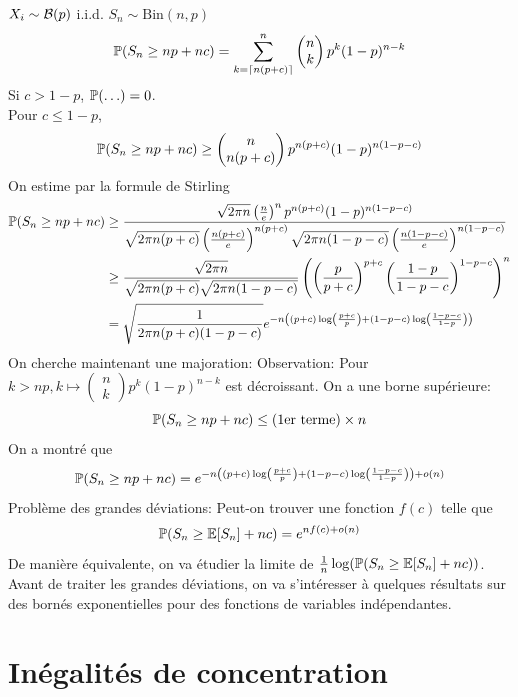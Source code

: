 \documentclass[]{report}
\begin{document}
    $X_i\sim \mathcal{B}(p)$ i.i.d. $S_n\sim \text{Bin}(n,p)$
    \[\mathbb{P}(S_n\ge np+nc)=\sum_{k=\lceil n(p+c)\rceil}^{n}\left(\begin{matrix}
        n\\
        k
    \end{matrix}\right)p^k(1-p)^{n-k}\]
    Si $c>1-p$, $\mathbb{P}(\ldots)=0$.\\
    Pour $c\le 1-p$,
    \[\mathbb{P}(S_n\ge np+nc)\ge \left(\begin{matrix}
        n\\
        n(p+c)
    \end{matrix}\right) p^{n(p+c)}(1-p)^{n(1-p-c)}\]
    On estime par la formule de Stirling
    \begin{align*}
        \mathbb{P}(S_n\ge np+nc)&\ge\frac{\sqrt{2\pi n}\left(\frac{n}{e}\right)^n p^{n(p+c)}(1-p)^{n(1-p-c)}}{\sqrt{2\pi n(p+c)}\left(\frac{n(p+c)}{e}\right)^{n(p+c)}\sqrt{2\pi n(1-p-c)}\left(\frac{n(1-p-c)}{e}\right)^{n(1-p-c)}}\\
        &\ge \frac{\sqrt{2\pi n}}{\sqrt{2\pi n(p+c)}\sqrt{2\pi n(1-p-c)}}\left(\left(\frac{p}{p+c}\right)^{p+c}\left(\frac{1-p}{1-p-c}\right)^{1-p-c}\right)^n\\
        &=\sqrt{\frac{1}{2\pi n(p+c)(1-p-c)}} e^{-n\left((p+c)\log \left(\frac{p+c}{p}\right)+(1-p-c)\log\left(\frac{1-p-c}{1-p}\right)\right)}
    \end{align*}
    On cherche maintenant une majoration: Observation: Pour $k>np,k\mapsto\left(\begin{matrix}
        n\\k
    \end{matrix}\right)p^k (1-p)^{n-k}$ est décroissant. On a une borne supérieure:
    \[\mathbb{P}(S_n\ge np+nc)\le (\text{1er terme})\times n\]
    On a montré que
    \[\mathbb{P}(S_n\ge np+nc)=e^{-n\left((p+c)\log\left(\frac{p+c}{p}\right)+(1-p-c)\log\left( \frac{1-p-c}{1-p}\right)\right)+o(n)}\]
    Problème des grandes déviations: Peut-on trouver une fonction $f(c)$ telle que
    \[\mathbb{P}(S_n\ge \mathbb{E}[S_n]+nc)=e^{nf(c)+o(n)}\]
    De manière équivalente, on va étudier la limite de $\frac{1}{n}\log(\mathbb{P}(S_n\ge \mathbb{E}[S_n]+nc))$. Avant de traiter les grandes déviations, on va s'intéresser à quelques résultats sur des bornés exponentielles pour des fonctions de variables indépendantes.

    \section{Inégalités de concentration}
\end{document}
